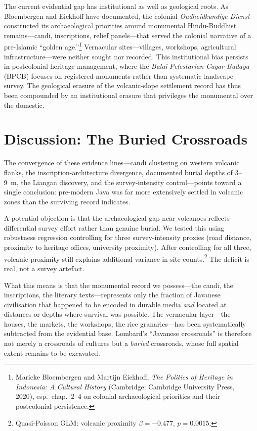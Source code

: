\documentclass[12pt,a4paper]{article}
\begin{document}
The current evidential gap has institutional as well as geological roots.
As Bloembergen and Eickhoff have documented, the colonial \emph{Oudheidkundige Dienst} constructed its archaeological priorities around monumental Hindu-Buddhist remains---candi, inscriptions, relief panels---that served the colonial narrative of a pre-Islamic ``golden age.''\footnote{Marieke Bloembergen and Martijn Eickhoff, \emph{The Politics of Heritage in Indonesia: A Cultural History} (Cambridge: Cambridge University Press, 2020), esp.\ chap.~2--4 on colonial archaeological priorities and their postcolonial persistence.}
Vernacular sites---villages, workshops, agricultural infrastructure---were neither sought nor recorded.
This institutional bias persists in postcolonial heritage management, where the \emph{Balai Pelestarian Cagar Budaya} (BPCB) focuses on registered monuments rather than systematic landscape survey.
The geological erasure of the volcanic-slope settlement record has thus been compounded by an institutional erasure that privileges the monumental over the domestic.


\section{Discussion: The Buried Crossroads}

The convergence of these evidence lines---candi clustering on western volcanic flanks, the inscription-architecture divergence, documented burial depths of 3--9~m, the Liangan discovery, and the survey-intensity control---points toward a single conclusion: pre-modern Java was far more extensively settled in volcanic zones than the surviving record indicates.

A potential objection is that the archaeological gap near volcanoes reflects differential survey effort rather than genuine burial.
We tested this using robustness regression controlling for three survey-intensity proxies (road distance, proximity to heritage offices, university proximity).
After controlling for all three, volcanic proximity still explains additional variance in site counts.\footnote{Quasi-Poisson GLM: volcanic proximity $\beta = -0.477$, $p = 0.0015$.}
The deficit is real, not a survey artefact.

What this means is that the monumental record we possess---the candi, the inscriptions, the literary texts---represents only the fraction of Javanese civilisation that happened to be encoded in durable media \emph{and} located at distances or depths where survival was possible.
The vernacular layer---the houses, the markets, the workshops, the rice granaries---has been systematically subtracted from the evidential base.
Lombard's ``Javanese crossroads'' is therefore not merely a crossroads of cultures but a \emph{buried} crossroads, whose full spatial extent remains to be excavated.
\end{document}
